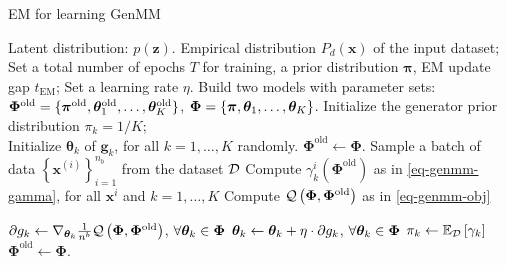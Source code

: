 \begin{algorithm}[t]
  \caption{EM for learning GenMM}\label{flow-algo-em}
  \begin{algorithmic}[1]
    Latent distribution: $p(\bm{z})$. Empirical distribution $P_d(\bm{x})$ of the input dataset;
    \STATE Set a total number of epochs $T$ for training, a prior distribution $\bm{\pi}$, EM update gap $t_{\mathrm{EM}}$;
    \STATE  Set a learning rate $\eta$. 
    \STATE Build two models with parameter sets:
    \STATE ${\bm{\Phi}}^{\mathrm{old}}=\{ \bm{\pi}^{\mathrm{old}},
    \bm{\theta}_1^{\mathrm{old}},\hdots,
    \bm{\theta}_K^{\mathrm{old}} \}$,
    \STATE ${\bm{\Phi}} = \{ \bm{\pi},
    \bm{\theta}_1,\hdots, \bm{\theta}_K \}$.
    \STATE Initialize the generator prior distribution $\pi_k = 1/K$;\\ Initialize $\bm{\theta}_k$ of $\bm{g}_k$, for all $k=1,\dots,K$ randomly. 
    \STATE $\bm{\Phi}^{\mathrm{old}} \gets \bm{\Phi}$.
    \STATE Sample a batch of data $\left\{ \bm{x}^{(i)}
    \right\}_{i=1}^{n_b}$ from the dataset $\mathcal{D}$ 
    \STATE Compute $\gamma_k^{i}(\bm{\Phi}^{\mathrm{old}})$ as in \autoref{eq-genmm-gamma},
    for all $\bm{x}^{i}$ and $k=1, \dots, K$
    \STATE Compute
    $\mathcal{Q}\left(\bm{\Phi},\bm{\Phi}^{\mathrm{old}}\right)$ as in \autoref{eq-genmm-obj}%
    
    \STATE $\partial{g_k} \gets \nabla_{\bm{\theta}_k} \frac{1}{n^{b}}\mathcal{Q}\left(
      \bm{\Phi}, \bm{\Phi}^{\mathrm{old}}\right)$,
    $\forall \bm{\theta}_k \in \bm{\Phi}$
    \STATE $\bm{\theta}_k \gets \bm{\theta}_k + \eta \cdot \partial{g_k}$, $\forall \bm{\theta}_k \in \bm{\Phi}$
    \ENDFOR
    \STATE $\pi_k \gets \mathbb{E}_{\mathcal{D}}\left[ \gamma_k \right]$ %
    \STATE $\bm{\Phi}^{\mathrm{old}} \gets \bm{\Phi}$.
    \ENDIF
    \ENDFOR
  \end{algorithmic}
\end{algorithm}

